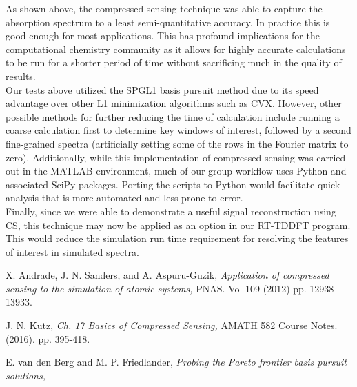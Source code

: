 \documentclass[11pt]{article}
\begin{document}
\par As shown above, the compressed sensing technique was able to capture the absorption spectrum to a least semi-quantitative accuracy. In practice this is good enough for most applications. This has profound implications for the computational chemistry community as it allows for highly accurate calculations to be run for a shorter period of time without sacrificing much in the quality of results.\\ 

Our tests above utilized the SPGL1 basis pursuit method due to its speed advantage over other L1 minimization algorithms such as CVX. However, other possible methods for further reducing the time of calculation include running a coarse calculation first to determine key windows of interest, followed by a second fine-grained spectra (artificially setting some of the rows in the Fourier matrix to zero). Additionally, while this implementation of compressed sensing was carried out in the MATLAB environment, much of our group workflow uses Python and associated SciPy packages. Porting the scripts to Python would facilitate quick analysis that is more automated and less prone to error.\\

Finally, since we were able to demonstrate a useful signal reconstruction using CS, this technique may now be applied as an option in our RT-TDDFT program.  This would reduce the simulation run time requirement for resolving the features of interest in simulated spectra.\\ 


\pagebreak

\begin{thebibliography}{9}
\setlength{\itemsep}{-2mm}\footnotesize{

 X. Andrade, J. N. Sanders, and A. Aspuru-Guzik, \textit{Application of compressed sensing to the simulation of atomic systems,} PNAS. Vol 109 (2012) pp. 12938-13933.

 J. N. Kutz, \textit{Ch. 17 Basics of Compressed Sensing,} AMATH 582 Course Notes. (2016). pp. 395-418.

 E. van den Berg and M. P. Friedlander, \textit{Probing the Pareto frontier basis pursuit solutions,}

}\end{thebibliography}
\end{document}
